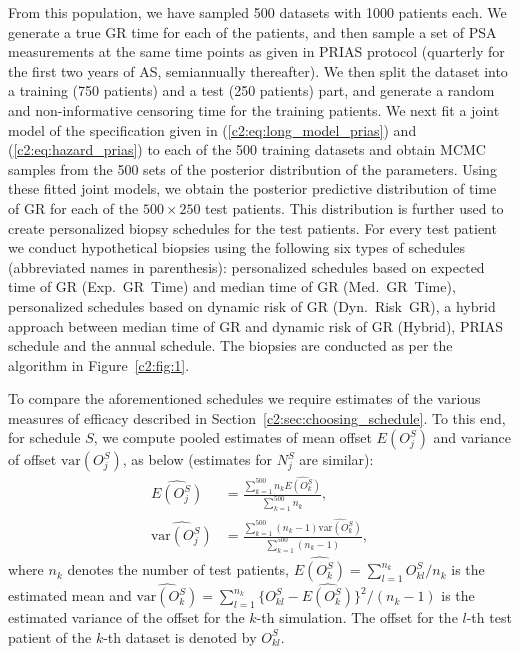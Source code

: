 From this population, we have sampled 500 datasets with 1000 patients each. We generate a true GR time for each of the patients, and then sample a set of PSA measurements at the same time points as given in PRIAS protocol (quarterly for the first two years of AS, semiannually thereafter). We then split the dataset into a training (750 patients) and a test (250 patients) part, and generate a random and non-informative censoring time for the training patients. We next fit a joint model of the specification given in (\ref{c2:eq:long_model_prias}) and (\ref{c2:eq:hazard_prias}) to each of the 500 training datasets and obtain MCMC samples from the 500 sets of the posterior distribution of the parameters. Using these fitted joint models, we obtain the posterior predictive distribution of time of GR for each of the $500 \times 250$ test patients. This distribution is further used to create personalized biopsy schedules for the test patients. For every test patient we conduct hypothetical biopsies using the following six types of schedules (abbreviated names in parenthesis): personalized schedules based on expected time of GR (Exp.~GR~Time) and median time of GR (Med.~GR~Time), personalized schedules based on dynamic risk of GR (Dyn.~Risk~GR), a hybrid approach between median time of GR and dynamic risk of GR (Hybrid), PRIAS schedule and the annual schedule. The biopsies are conducted as per the algorithm in Figure~\ref{c2:fig:1}. 

To compare the aforementioned schedules we require estimates of the various measures of efficacy described in Section~\ref{c2:sec:choosing_schedule}. To this end, for schedule $S$, we compute pooled estimates of mean offset $E(O^S_j)$ and variance of offset $\mbox{var}(O^S_j)$, as below (estimates for $N^S_j$ are similar):
\begin{align*}
\widehat{E(O^S_j)} &= \frac{\sum_{k=1}^{500} n_k \widehat{E(O^S_k)}}{\sum_{k=1}^{500} n_k}, \\
\widehat{\mbox{var}(O^S_j)} &= \frac{\sum_{k=1}^{500} (n_k - 1) \widehat{\mbox{var}(O^S_k)}}{\sum_{k=1}^{500} (n_k-1)}, 
\end{align*}
where $n_k$ denotes the number of test patients, $\widehat{E(O^S_k)} = {\sum_{l=1}^{n_k}O^S_{kl}}/{n_k}$ is the estimated mean and $\widehat{\mbox{var}(O^S_k)} = {\sum_{l=1}^{n_k}\big\{O^S_{kl} - \widehat{E(O^S_k)}\big\}^2}/(n_k-1)$ is the estimated variance of the offset for the $k$-th simulation. The offset for the $l$-th test patient of the $k$-th dataset is denoted by $O^S_{kl}$.

